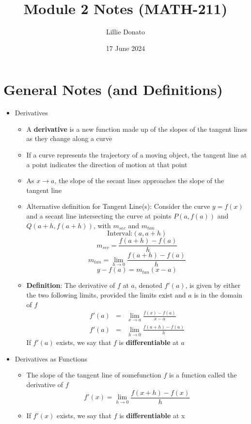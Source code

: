 \documentclass{article}
\title{Module 2 Notes (MATH-211)}
\author{Lillie Donato}
\date{17 June 2024}
\begin{document}
\maketitle

\section*{General Notes (and Definitions)}
\begin{itemize}
    \item Derivatives
    \begin{itemize}
        \item A \textbf{derivative} is a new function made up of the slopes of the tangent lines as they change along a curve
        \item If a curve represents the trajectory of a moving object, the tangent line at a point indicates the direction of motion at that point
        \item As $x \to a$, the slope of the secant lines approaches the slope of the tangent line
        \item Alternative definition for Tangent Line(s): Consider the curve $y = f(x)$ and a secant line intersecting the curve at points $P(a, f(a))$ and $Q(a + h, f(a + h))$, with $m_{sec}$ and $m_{tan}$
        $$\text{Interval:} (a, a + h)$$
        $$m_{sec} = \frac{f(a + h) - f(a)}{h}$$
        $$m_{tan} = \lim_{h \to 0}{\frac{f(a + h) - f(a)}{h}}$$
        $$y - f(a) = m_{tan}(x - a)$$
        \item \textbf{Definition}: The derivative of $f$ at $a$, denoted $f'(a)$, is given by either the two following limits, provided the limits exist and $a$ is in the domain of $f$
        \begin{eqnarray}
            f'(a) &=& \lim_{x \to a}{\frac{f(x) - f(a)}{x - a}} \\
            f'(a) &=& \lim_{h \to 0}{\frac{f(a + h) - f(a)}{h}}
        \end{eqnarray}
        If $f'(a)$ exists, we say that $f$ is \textbf{differentiable} at $a$
    \end{itemize}
\item Derivatives as Functions
    \begin{itemize}
        \item The slope of the tangent line of somefunction $f$ is a function called the derivative of $f$
            $$f'(x) = \lim_{h \to 0}{\frac{f(x + h) - f(x)}{h}}$$
        \item If $f'(x)$ exists, we say that $f$ is \textbf{differentiable} at x

\end{itemize}
\end{itemize}
\end{document}
